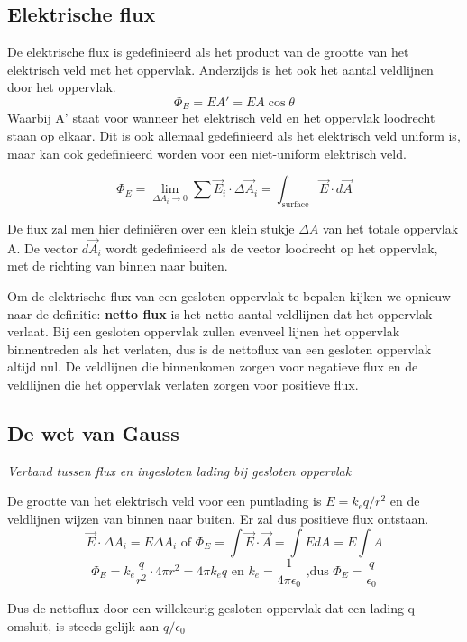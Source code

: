 \documentclass[12pt,a4paper]{article}
\begin{document}
    \subsection{Elektrische flux}
    De elektrische flux is gedefinieerd als het product van de grootte van het elektrisch veld met het oppervlak. Anderzijds is het ook het aantal veldlijnen door het oppervlak. 
    \[\Phi_E = EA' = EA\cos\theta\]
    Waarbij A' staat voor wanneer het elektrisch veld en het oppervlak loodrecht staan op elkaar. Dit is ook allemaal gedefinieerd als het elektrisch veld uniform is, maar kan ook gedefinieerd worden voor een niet-uniform elektrisch veld.
    
    \[\Phi_E = \lim_{\Delta A_i \rightarrow 0} \sum \vec{E}_i \cdot \Delta\vec{A}_i = \int_{\text{surface}} \vec{E}\cdot d\vec{A}\]
    
    De flux zal men hier definiëren over een klein stukje $\Delta A$ van het totale oppervlak A. De vector $d\vec{A}_i$ wordt gedefinieerd als de vector loodrecht op het oppervlak, met de richting van binnen naar buiten.
    
    Om de elektrische flux van een gesloten oppervlak te bepalen kijken we opnieuw naar de definitie: \textbf{netto flux} is het netto aantal veldlijnen dat het oppervlak verlaat. Bij een gesloten oppervlak zullen evenveel lijnen het oppervlak binnentreden als het verlaten, dus is de nettoflux van een gesloten oppervlak altijd nul. De veldlijnen die binnenkomen zorgen voor negatieve flux en de veldlijnen die het oppervlak verlaten zorgen voor positieve flux.
    
    \subsection{De wet van Gauss}
    \textit{Verband tussen flux en ingesloten lading bij gesloten oppervlak}
    
    De grootte van het elektrisch veld voor een puntlading is \(E = k_e q/r^2\) en de veldlijnen wijzen van binnen naar buiten. Er zal dus positieve flux ontstaan. 
   	\[\vec{E}\cdot\Delta A_i = E\Delta A_i \text{  of  } \Phi_E = \int\vec{E}\cdot\vec{A} = \int EdA = E\int A\]
   	\[\Phi_E = k_e\frac{q}{r^2}\cdot 4\pi r^2 = 4\pi k_eq \text{  en  } k_e = \frac{1}{4\pi\epsilon_0} \text{  ,dus  } \Phi_E = \frac{q}{\epsilon_0}\]
   	
   	Dus de nettoflux door een willekeurig gesloten oppervlak dat een lading q omsluit, is steeds gelijk aan $q/\epsilon_0$
   	
\end{document}
